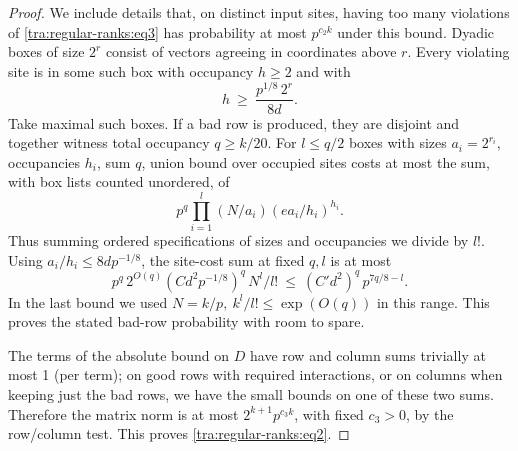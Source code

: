 \begin{proof}
We include details that, on distinct input sites, having too many violations of \eqref{tra:regular-ranks:eq3} has probability at most \(p^{c_2 k}\) under this bound. Dyadic boxes of size \(2^r\) consist of vectors agreeing in coordinates above \(r\). Every violating site is in some such box with occupancy \(h\ge 2\) and with
\[
                       h\ \ge\ \frac{p^{1/8}\,2^r}{8d}.
\]
Take maximal such boxes. If a bad row is produced, they are disjoint and together witness total occupancy \(q\ge k/20\). For \(l\le q/2\) boxes with sizes \(a_i=2^{r_i}\), occupancies \(h_i\), sum \(q\), union bound over occupied sites costs at most the sum, with box lists counted unordered, of
\[
                p^q \prod_{i=1}^l (N/a_i)(e a_i/h_i)^{h_i}.
\]
Thus summing ordered specifications of sizes and occupancies we divide by \(l!\). Using \(a_i/h_i\le 8d p^{-1/8}\), the site-cost sum at fixed \(q,l\) is at most
\[
                p^q\, 2^{O(q)} (C d^2 p^{-1/8})^q\, N^l/l!
                 \ \le\ (C' d^2)^q\, p^{7q/8-l}.
\]
In the last bound we used \(N=k/p,\ k^l/l!\le \exp(O(q))\) in this range. This proves the stated bad-row probability with room to spare.

The terms of the absolute bound on \(D\) have row and column sums trivially at most 1 (per term); on good rows with required interactions, or on columns when keeping just the bad rows, we have the small bounds on one of these two sums. Therefore the matrix norm is at most \(2^{k+1}p^{c_3 k}\), with fixed \(c_3>0\), by the row/column test. This proves \eqref{tra:regular-ranks:eq2}.
\end{proof}
